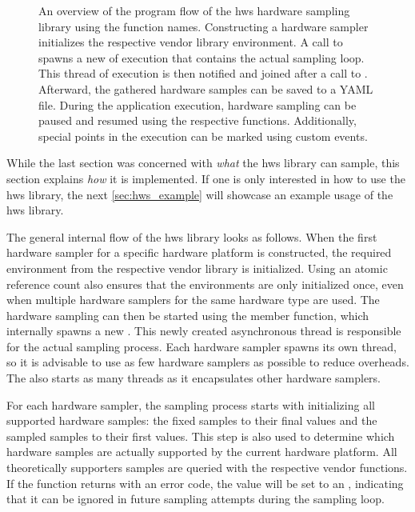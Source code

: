 \begin{figure}
{\begin{tikzpicture}[font=\small]
    \end{tikzpicture}
    }
    \caption{%
    An overview of the program flow of the hws hardware sampling library using the \cpp function names. 
    Constructing a hardware sampler initializes the respective vendor library environment. 
    A call to  spawns a new  of execution that contains the actual sampling loop. 
    This thread of execution is then notified and joined after a call to . 
    Afterward, the gathered hardware samples can be saved to a YAML file. 
    During the application execution, hardware sampling can be paused and resumed using the respective functions. 
    Additionally, special points in the execution can be marked using custom events. 
    }
    \label{fig:program_flow}
\end{figure}

While the last section was concerned with \textit{what} the hws library can sample, this section explains \textit{how} it is implemented. 
If one is only interested in how to use the hws library, the next \autoref{sec:hws_example} will showcase an example usage of the hws library. 

The general internal flow of the hws library looks as follows. 
When the first hardware sampler for a specific hardware platform is constructed, the required environment from the respective vendor library is initialized. 
Using an atomic reference count also ensures that the environments are only initialized once, even when multiple hardware samplers for the same hardware type are used. 
The hardware sampling can then be started using the  member function, which internally spawns a new . 
This newly created asynchronous thread is responsible for the actual sampling process. 
Each hardware sampler spawns its own thread, so it is advisable to use as few hardware samplers as possible to reduce overheads. 
The  also starts as many threads as it encapsulates other hardware samplers. 

For each hardware sampler, the sampling process starts with initializing all supported hardware samples: the fixed samples to their final values and the sampled samples to their first values. 
This step is also used to determine which hardware samples are actually supported by the current hardware platform. 
All theoretically supporters samples are queried with the respective vendor functions. 
If the function returns with an error code, the value will be set to an , indicating that it can be ignored in future sampling attempts during the sampling loop. 

